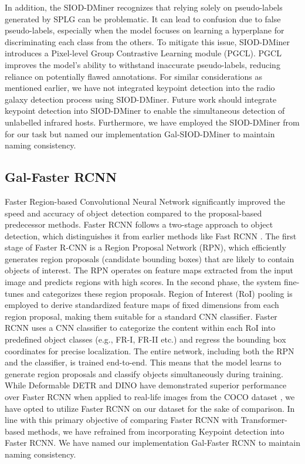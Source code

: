 \documentclass[
  journal=pasa,
  manuscript=research-paper, %
  year=2020,
  volume=37,
]{cup-journal}
\begin{document}
In addition, the SIOD-DMiner recognizes that relying solely on pseudo-labels generated by SPLG can be problematic. It can lead to confusion due to false pseudo-labels, especially when the model focuses on learning a hyperplane for discriminating each class from the others. To mitigate this issue, SIOD-DMiner introduces a Pixel-level Group Contrastive Learning module (PGCL). 
PGCL improves the model's ability to withstand inaccurate pseudo-labels, reducing reliance on potentially flawed annotations.
For similar considerations as mentioned earlier, we have not integrated keypoint detection into the radio galaxy detection process using SIOD-DMiner. 
Future work should integrate keypoint detection into SIOD-DMiner to enable the simultaneous detection of unlabelled infrared hosts.
Furthermore, we have employed the SIOD-DMiner from \citet{li2022siod} for our task but named our implementation Gal-SIOD-DMiner to maintain naming consistency.

\subsection{Gal-Faster RCNN}
\label{SEC:GalFRCNN}
Faster Region-based Convolutional Neural Network \citep[Faster RCNN;][]{ren2015faster} significantly improved the speed and accuracy of object detection compared to the proposal-based predecessor methods. 
Faster RCNN follows a two-stage approach to object detection, which distinguishes it from earlier methods like Fast RCNN \citep[][]{girshick2015fast}.
The first stage of Faster R-CNN is a Region Proposal Network (RPN), which efficiently generates region proposals (candidate bounding boxes) that are likely to contain objects of interest. The RPN operates on feature maps extracted from the input image and predicts regions with high scores.
In the second phase, the system fine-tunes and categorizes these region proposals. 
Region of Interest (RoI) pooling is employed to derive standardized feature maps of fixed dimensions from each region proposal, making them suitable for a standard CNN classifier.
Faster RCNN uses a CNN classifier to categorize the content within each RoI into predefined object classes (e.g., FR-I, FR-II etc.) and regress the bounding box coordinates for precise localization.
The entire network, including both the RPN and the classifier, is trained end-to-end. This means that the model learns to generate region proposals and classify objects simultaneously during training.
While Deformable DETR and DINO have demonstrated superior performance over Faster RCNN when applied to real-life images from the COCO dataset \citep[][]{zhu2021deformable, zhang2022dino}, we have opted to utilize Faster RCNN on our dataset for the sake of comparison. 
In line with this primary objective of comparing Faster RCNN with Transformer-based methods, we have refrained from incorporating Keypoint detection into Faster RCNN. 
We have named our implementation Gal-Faster RCNN to maintain naming consistency.
\end{document}
